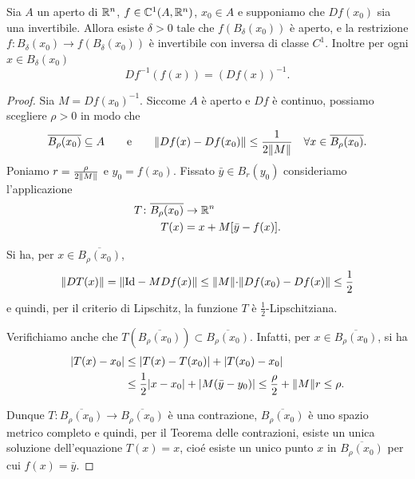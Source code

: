 \begin{theorem}
Sia $A$ un aperto di ${\mathbb R}^n$, $f\in {\mathbb C}^1(A,{\mathbb R}^n)$,
$x_0\in A$ e supponiamo che $Df(x_0)$ sia una invertibile.
Allora esiste $\delta>0$ tale che $f(B_\delta(x_0))$ è aperto, 
e la restrizione $f\colon B_\delta(x_0)\to f(B_\delta(x_0))$
è invertibile con inversa di classe $C^1$.
Inoltre per ogni $x \in B_\delta(x_0)$
\[
        D f^{-1}(f(x))=(Df(x))^{-1}.
\]
\end{theorem}
\begin{proof}
Sia $M=Df(x_0)^{-1}$. 
Siccome $A$ è aperto e $Df$ è continuo, 
possiamo scegliere $\rho>0$ in modo che
\[    
    \overline{B_\rho(x_0)}\subseteq A
        \qquad \text{e} \qquad
        {\left\Vert Df(x)-Df(x_0)\right\Vert} \le \frac{1}{2{\left\Vert M\right\Vert}}
                \quad\forall x\in \overline{B_\rho(x_0)}.
\]
Poniamo $r=\frac{\rho}{2{\left\Vert M\right\Vert}}$ e
$y_0=f(x_0)$.  
Fissato $\bar y\in B_r(y_0)$
consideriamo l'applicazione
\begin{align*}
        T\colon \overline{B_\rho(x_0)} &\to {\mathbb R}^n\\
        T(x) &= x + M[\bar y-f(x)].
\end{align*}

Si ha, per $x\in \overline{B_\rho(x_0)}$,
\[
        {\left\Vert  DT(x)\right\Vert}
        = {\left\Vert  \mathrm{Id}-M Df(x)\right\Vert} \le 
        {\left\Vert  M {\left\Vert \cdot\right\Vert} Df(x_0)-Df(x)\right\Vert}
        \le \frac{1}{2}
\]
e quindi, per il criterio di Lipschitz, la funzione $T$ \`e $\frac 1
2$-Lipschitziana.

Verifichiamo anche che $T(\overline{B_\rho(x_0)})\subset \overline{B_\rho(x_0)}$.
Infatti, per $x\in \overline{B_\rho(x_0)}$, si ha
        \begin{align*}
        |T(x)-x_0|&\le |T(x)-T(x_0)| + |T(x_0)-x_0|\\
        &\le \frac 1 2 |x-x_0| + |M (\bar y-y_0)|
        \le \frac \rho 2 + {\left\Vert  M\right\Vert}  r
        \le \rho.
        \end{align*}

Dunque $T\colon\overline{B_\rho(x_0)}\to \overline{B_\rho(x_0)}$ è una
contrazione, $\overline{B_\rho(x_0)}$ è uno spazio metrico completo
e quindi, per il Teorema delle contrazioni, 
esiste un unica soluzione dell'equazione $T(x)=x$,
cioé esiste un unico punto $x$ in $\overline{B_\rho(x_0)}$ per cui $f(x)=\bar y$.


\end{proof}
